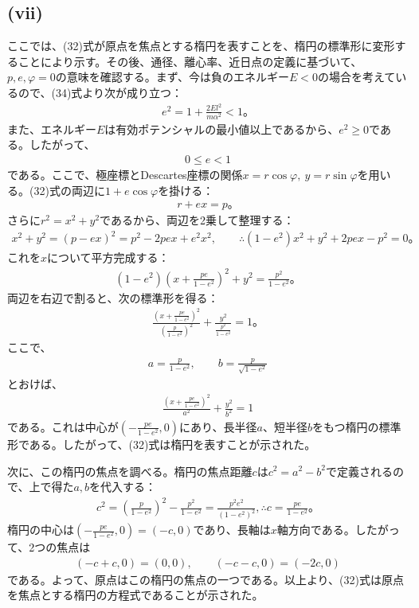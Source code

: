   \subsection*{(vii)}
  ここでは、(32)式が原点を焦点とする楕円を表すことを、楕円の標準形に変形することにより示す。その後、通径、離心率、近日点の定義に基づいて、$p,e,\varphi=0$の意味を確認する。まず、今は負のエネルギー$E<0$の場合を考えているので、(34)式より次が成り立つ：
  \begin{align*}
    e^2=1+\frac{2El^2}{m\alpha^2}<1。
  \end{align*}
  また、エネルギー$E$は有効ポテンシャルの最小値以上であるから、$e^2\geq0$である。したがって、
  \begin{align*}
    0\leq e<1
  \end{align*}
  である。ここで、極座標とDescartes座標の関係$x=r\cos\varphi,\ y=r\sin\varphi$を用いる。(32)式の両辺に$1+e\cos\varphi$を掛ける：
  \begin{align*}
    r+ex=p。
  \end{align*}
  さらに$r^2=x^2+y^2$であるから、両辺を2乗して整理する：
  \begin{align*}
    x^2+y^2=(p-ex)^2=p^2-2pex+e^2x^2,\qquad \therefore (1-e^2)x^2+y^2+2pex-p^2=0。
  \end{align*}
  これを$x$について平方完成する：
  \begin{align*}
    (1-e^2)\left(x+\frac{pe}{1-e^2}\right)^2+y^2=\frac{p^2}{1-e^2}。
  \end{align*}
  両辺を右辺で割ると、次の標準形を得る：
  \begin{align*}
    \frac{\left(x+\frac{pe}{1-e^2}\right)^2}{\left(\frac{p}{1-e^2}\right)^2}+\frac{y^2}{\frac{p^2}{1-e^2}}=1。
  \end{align*}
  ここで、
  \begin{align*}
    a=\frac{p}{1-e^2},\qquad b=\frac{p}{\sqrt{1-e^2}}
  \end{align*}
  とおけば、
  \begin{align*}
    \frac{\left(x+\frac{pe}{1-e^2}\right)^2}{a^2}+\frac{y^2}{b^2}=1
  \end{align*}
  である。これは中心が$\left(-\frac{pe}{1-e^2},0\right)$にあり、長半径$a$、短半径$b$をもつ楕円の標準形である。したがって、(32)式は楕円を表すことが示された。

  次に、この楕円の焦点を調べる。楕円の焦点距離$c$は$c^2=a^2-b^2$で定義されるので、上で得た$a,b$を代入する：
  \begin{align*}
    c^2=\left(\frac{p}{1-e^2}\right)^2-\frac{p^2}{1-e^2}=\frac{p^2e^2}{(1-e^2)^2},\therefore c=\frac{pe}{1-e^2}。
  \end{align*}
  楕円の中心は$\left(-\frac{pe}{1-e^2},0\right)=(-c,0)$であり、長軸は$x$軸方向である。したがって、2つの焦点は
  \begin{align*}
    (-c+c,0)=(0,0),\qquad (-c-c,0)=(-2c,0)
  \end{align*}
  である。よって、原点はこの楕円の焦点の一つである。以上より、(32)式は原点を焦点とする楕円の方程式であることが示された。

